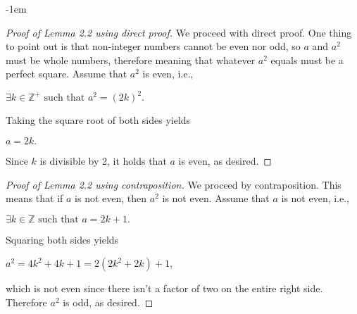 \documentclass[12pt,a4paper]{article}
\theoremstyle{definition}
\begin{document}
\kern-1em
\color{red}
\begin{proof}[Proof of Lemma 2.2 using direct proof]
We proceed with direct proof. One thing to point out is that non-integer numbers cannot be even nor odd, so $a$ and $a^2$ must be whole numbers, therefore meaning that whatever $a^2$ equals must be a perfect square. Assume that $a^2$ is even, i.e., 

\begin{center}
$\exists k\in\mathbb{Z}^+ \text{ such that } a^2=(2k)^2.$
\end{center}

Taking the square root of both sides yields 

\begin{center}
$a=2k.$
\end{center}

Since $k$ is divisible by 2, it holds that $a$ is even, as desired.
\end{proof}

\begin{proof}[Proof of Lemma 2.2 using contraposition]
We proceed by contraposition. This means that if $a$ is not even, then $a^2$ is not even. Assume that $a$ is not even, i.e.,

\begin{center}
$\exists k\in\mathbb{Z} \text{ such that } a=2k+1.$
\end{center}

Squaring both sides yields

\begin{center}
$a^2=4k^2+4k+1=2(2k^2+2k)+1$,
\end{center}

which is not even since there isn't a factor of two on the entire right side. Therefore $a^2$ is odd, as desired.
\end{proof}
\end{document}
